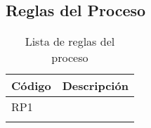 

\newpage
\subsection{Reglas del Proceso}
\begin{longtable}{p{5cm}|p{11cm}}%
		\hline
			\textbf{Código} & \textbf{Descripción}\\
		\hline\hline
			{RP1} & {}\\ %
		\hline
\caption{Lista de reglas del proceso}
\end{longtable}

